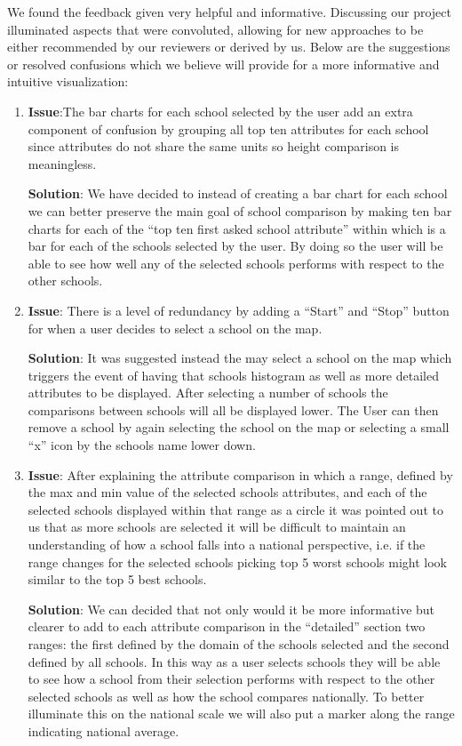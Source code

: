 \documentclass[11pt, a4paper]{article}
\begin{document}
We found the feedback given very helpful and informative. Discussing our project illuminated aspects that were convoluted, allowing for new approaches to be either recommended by our reviewers or derived by us. Below are the suggestions or resolved confusions which we believe will provide for a more informative and intuitive visualization:
\begin{enumerate}
\item \textbf{Issue}:The bar charts for each school selected by the user add an extra component of confusion by grouping all top ten attributes for each school since attributes do not share the same units so height comparison is meaningless.
  
  \textbf{Solution}: We have decided to instead of creating a bar chart for each school we can better preserve the main goal of school comparison by making ten bar charts for each of the ``top ten first asked school attribute'' within which is a bar for each of the schools selected by the user. By doing so the user will be able to see how well any of the selected schools performs with respect to the other schools.
\item \textbf{Issue}: There is a level of redundancy by adding a ``Start'' and ``Stop'' button for when a user decides to select a school on the map.

  \textbf{Solution}: It was suggested instead the may select a school on the map which triggers the event of having that schools histogram as well as more detailed attributes to be displayed. After selecting a number of schools the comparisons between schools will all be displayed lower. The User can then remove a school by again selecting the school on the map or selecting a small ``x'' icon by the schools name lower down.

\item \textbf{Issue}: After explaining the attribute comparison in which a range, defined by the max and min value of the selected schools attributes, and each of the selected schools displayed within that range as a circle it was pointed out to us that as more schools are selected it will be difficult to maintain an understanding of how a school falls into a national perspective, i.e. if the range changes for the selected schools picking top 5 worst schools might look similar to the top 5 best schools.

  \textbf{Solution}: We can decided that not only would it be more informative but clearer to add to each attribute comparison in the ``detailed'' section two ranges: the first defined by the domain of the schools selected and the second defined by all schools. In this way as a user selects schools they will be able to see how a school from their selection performs with respect to the other selected schools as well as how the school compares nationally. To better illuminate this on the national scale we will also put a marker along the range indicating national average.
  
  

\end{enumerate}
\end{document}
